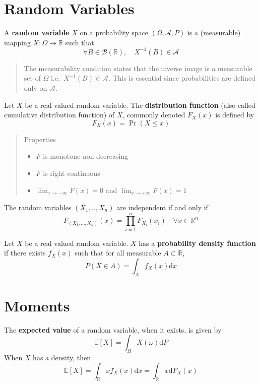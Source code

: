\documentclass[12pt,]{book}
\providecommand{\tightlist}{%
  \setlength{\itemsep}{0pt}\setlength{\parskip}{0pt}}
\begin{document}
\hypertarget{random-variables}{%
\section{Random Variables}\label{random-variables}}

A \textbf{random variable} \(X\) on a probability space \((\Omega,\mathcal A, P)\) is a (measurable) mapping \(X : \Omega \to \mathbb{R}\) such that
\[
  \forall B \in \mathcal{B}(\mathbb{R}), \quad X^{-1}(B) \in \mathcal{A}
\]

\begin{quote}
The measurability condition states that the inverse image is a measurable set of \(\Omega\) i.e.~\(X^{-1}(B) \in \mathcal A\). This is essential since probabilities are defined only on \(\mathcal A\).
\end{quote}

Let \(X\) be a real valued random variable. The \textbf{distribution function} (also called cumulative distribution function) of \(X\), commonly denoted \(F_X(x)\) is defined by
\[
    F_X(x) = \Pr(X \leq x)
\]

\begin{quote}
Properties

\begin{itemize}
\tightlist
\item
  \(F\) is monotone non-decreasing
\item
  \(F\) is right continuous
\item
  \(\lim _ {x \to - \infty} F(x)=0\) and \(\lim _ {x \to + \infty} F(x)=1\)
\end{itemize}
\end{quote}

The random variables \((X_1, .. , X_n)\) are independent if and only if
\[
  F _ {(X_1, ... , X_n)} (x) = \prod _ {i=1}^n F_{X_i} (x_i) \quad \forall x \in \mathbb R^n
\]

Let \(X\) be a real valued random variable. \(X\) has a \textbf{probability density function} if there exists \(f_X(x)\) such that for all measurable \(A \subset \mathbb{R}\),
\[
        P(X \in A) = \int_A f_X(x) \mathrm{d} x
\]

\hypertarget{moments}{%
\section{Moments}\label{moments}}

The \textbf{expected value} of a random variable, when it exists, is given by
\[
        \mathbb{E}[X] = \int_ \Omega X(\omega) \mathrm{d} P
\]
When \(X\) has a density, then
\[
        \mathbb{E} [X] = \int_ \mathbb{R} x f_X (x) \mathrm{d} x = \int _ \mathbb{R} x \mathrm{d} F_X (x) 
\]
\end{document}
